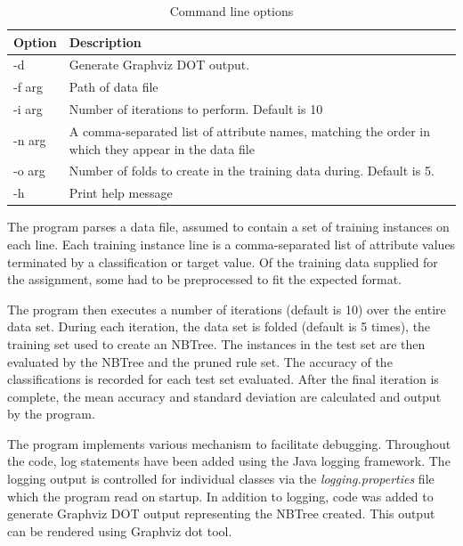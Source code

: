 \documentclass[10pt]{report}
\begin{document}
\begin{table}[h]
  \centering
  \begin{tabular}{ |l|p{10cm}|} 
    \hline
    Option & Description \\ \hline
    -d          &  Generate Graphviz DOT output. \\ \hline
    -f \<arg\>  &  Path of data file \\ \hline
    -i \<arg\>  &  Number of iterations to perform. Default is 10 \\ \hline
    -n \<arg\>  &  A comma-separated list of attribute names, matching
    the order in which they appear in the data file \\ \hline
    -o \<arg\>  &  Number of folds to create in the training data during. Default is 5. \\ \hline
    -h          &  Print help message \\ \hline
  \end{tabular}
  \caption{Command line options}
  \label{tab:commandline}
\end{table}

The program parses a data file, assumed to contain a set of training
instances on each line. Each training instance line is a
comma-separated list of attribute values terminated by a
classification or target value. Of the training data supplied for the
assignment, some had to be preprocessed to fit the expected format.

The program then executes a number of iterations (default is 10) over
the entire data set. During each iteration, the data set is folded
(default is 5 times), the training set used to create an NBTree. The
instances in the test set are then evaluated by the NBTree and
the pruned rule set. The accuracy of the classifications is recorded
for each test set evaluated. After the final iteration is complete,
the mean accuracy and standard deviation are calculated and output by
the program.

The program implements various mechanism to facilitate
debugging. Throughout the code, log statements have been added using
the Java logging framework. The logging output is controlled for
individual classes via the \textit{logging.properties} file which the program
read on startup. In addition to logging, code was added to generate
Graphviz DOT \cite{Graphviz2001} output representing
the NBTree created. This output can be rendered using Graphviz
dot tool. 
\end{document}
